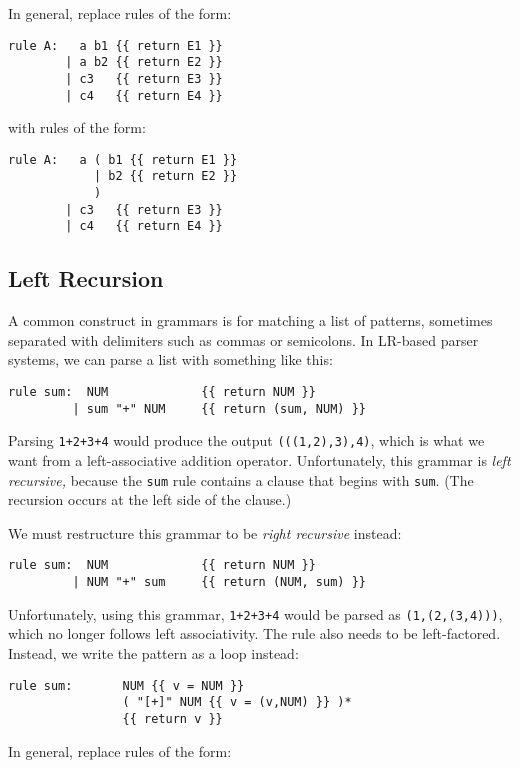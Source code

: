 \documentclass[10pt]{article}
\newcommand{\mysubsection}[1]{\subsection{#1}}
\begin{document}
In general, replace rules of the form:

\begin{verbatim}
rule A:   a b1 {{ return E1 }}
        | a b2 {{ return E2 }}
        | c3   {{ return E3 }}
        | c4   {{ return E4 }}
\end{verbatim}

with rules of the form:

\begin{verbatim}
rule A:   a ( b1 {{ return E1 }}
            | b2 {{ return E2 }}
            )
        | c3   {{ return E3 }}
        | c4   {{ return E4 }}
\end{verbatim}

\mysubsection{Left Recursion}

A common construct in grammars is for matching a list of patterns,
sometimes separated with delimiters such as commas or semicolons.  In
LR-based parser systems, we can parse a list with something like this:

\begin{verbatim}
rule sum:  NUM             {{ return NUM }}
         | sum "+" NUM     {{ return (sum, NUM) }}
\end{verbatim}

Parsing \texttt{1+2+3+4} would produce the output
\texttt{(((1,2),3),4)}, which is what we want from a left-associative
addition operator.  Unfortunately, this grammar is \emph{left
recursive,} because the \texttt{sum} rule contains a clause that
begins with \texttt{sum}.  (The recursion occurs at the left side of
the clause.)

We must restructure this grammar to be \emph{right recursive} instead:

\begin{verbatim}
rule sum:  NUM             {{ return NUM }}
         | NUM "+" sum     {{ return (NUM, sum) }}
\end{verbatim}

Unfortunately, using this grammar, \texttt{1+2+3+4} would be parsed as
\texttt{(1,(2,(3,4)))}, which no longer follows left associativity.
The rule also needs to be left-factored.  Instead, we write the
pattern as a loop instead:

\begin{verbatim}
rule sum:       NUM {{ v = NUM }}
                ( "[+]" NUM {{ v = (v,NUM) }} )*
                {{ return v }}
\end{verbatim}

In general, replace rules of the form:
\end{document}
